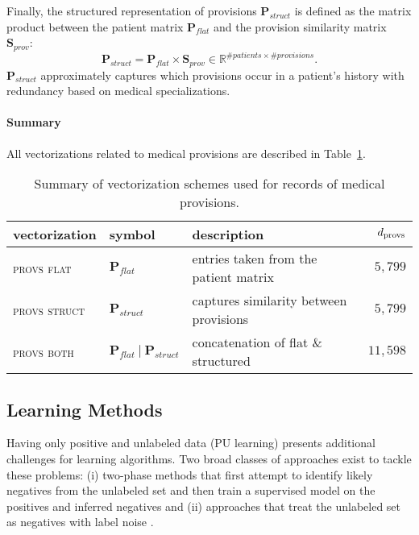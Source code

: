 \documentclass[twoside,11pt]{article}
\newcommand{\dprovs}{d_{\rm provs}}
\begin{document}
Finally, the structured representation of provisions $\mathbf{P}_{struct}$ is defined as the matrix product between the patient matrix $\mathbf{P}_{flat}$ and the provision similarity matrix $\mathbf{S}_{prov}$:
\begin{equation}
\mathbf{P}_{struct} = \mathbf{P}_{flat} \times \mathbf{S}_{prov} \in \mathbb{R}^{\# patients \times \# provisions}.
\end{equation}
$\mathbf{P}_{struct}$ approximately captures which provisions occur in a patient's history with redundancy based on medical specializations.

\paragraph{Summary} All vectorizations related to medical provisions are described in Table~\ref{table:prov-vects}.
\begin{table}[!h]
\centering
\begin{tabular}{lllr}
\toprule
vectorization	 & symbol & description	 & $\dprovs$ \\
\midrule
\textsc{provs flat}	 & $\mathbf{P}_{flat}$ & entries taken from the patient matrix	& $5,799$ \\
\textsc{provs struct}	 & $\mathbf{P}_{struct}$ & captures similarity between provisions	& $5,799$ \\
\textsc{provs both}	 & $\mathbf{P}_{flat}\ |\ \mathbf{P}_{struct}$ & concatenation of flat \& structured  			& $11,598$ \\
\bottomrule
\end{tabular}
\caption{Summary of vectorization schemes used for records of medical provisions.}
\label{table:prov-vects}
\end{table}


\subsection{Learning Methods} \label{learning-methods}
Having only positive and unlabeled data (PU learning) presents additional challenges for learning algorithms. Two broad classes of approaches exist to tackle these problems: (i) two-phase methods that first attempt to identify likely negatives from the unlabeled set and then train a supervised model on the positives and inferred negatives \citep{liu02partially, Yu:2005:SCM:1108759.1108762} and (ii) approaches that treat the unlabeled set as negatives with label noise \citep{Elkan:2008:LCO:1401890.1401920,Lee03learningwith,mordelet2014bagging,Claesen2015resvm}. 
\end{document}
